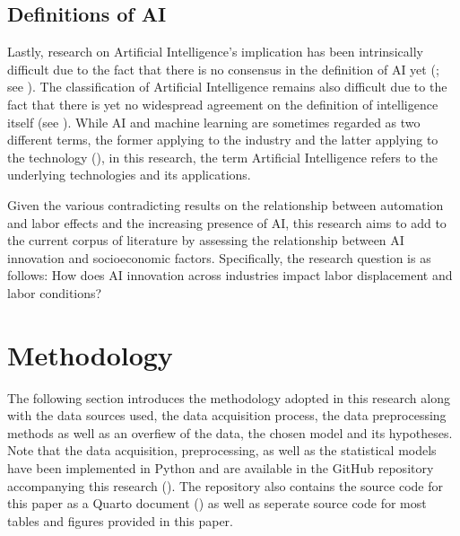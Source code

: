 \documentclass[
  12pt,
  a4paperpaper,
]{article}
\begin{document}
\subsection{Definitions of AI}\label{sec-definitions-of-ai}

Lastly, research on Artificial Intelligence's implication has been
intrinsically difficult due to the fact that there is no consensus in
the definition of AI yet (; see ). The classification of Artificial Intelligence remains also
difficult due to the fact that there is yet no widespread agreement on
the definition of intelligence itself (see
). While AI
and machine learning are sometimes regarded as two different terms, the
former applying to the industry and the latter applying to the
technology (),
in this research, the term Artificial Intelligence refers to the
underlying technologies and its applications.

Given the various contradicting results on the relationship between
automation and labor effects and the increasing presence of AI, this
research aims to add to the current corpus of literature by assessing
the relationship between AI innovation and socioeconomic factors.
Specifically, the research question is as follows: How does AI
innovation across industries impact labor displacement and labor
conditions?

\section{Methodology}\label{sec-methodology}

The following section introduces the methodology adopted in this
research along with the data sources used, the data acquisition process,
the data preprocessing methods as well as an overfiew of the data, the
chosen model and its hypotheses. Note that the data acquisition,
preprocessing, as well as the statistical models have been implemented
in Python and are available in the GitHub repository accompanying this
research (). The
repository also contains the source code for this paper as a Quarto
document () as
well as seperate source code for most tables and figures provided in
this paper.
\end{document}
